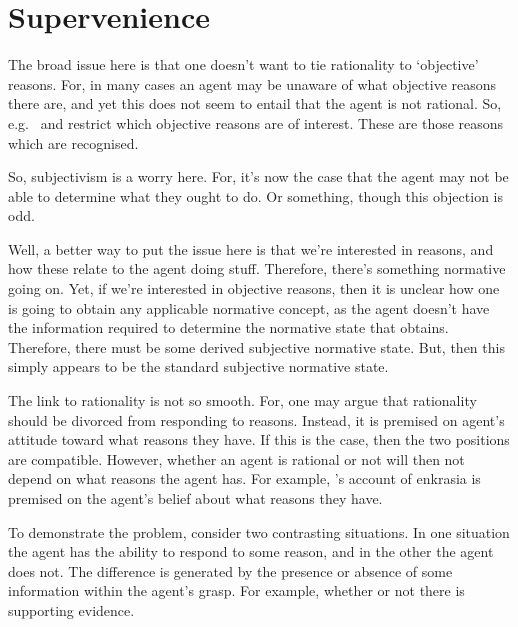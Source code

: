 \documentclass[10pt]{article}
\begin{document}
\section{Supervenience}
\label{sec:supervenience-1}

\begin{note}
  The broad issue here is that one doesn't want to tie rationality to `objective' reasons.
  For, in many cases an agent may be unaware of what objective reasons there are, and yet this does not seem to entail that the agent is not rational.
  So, e.g.\ \citeauthor{Lord:2018aa} and \citeauthor{Kiesewetter:2017aa} restrict which objective reasons are of interest.
  These are those reasons which are recognised.

  So, subjectivism is a worry here.
  For, it's now the case that the agent may not be able to determine what they ought to do.
  Or something, though this objection is odd.

  Well, a better way to put the issue here is that we're interested in reasons, and how these relate to the agent doing stuff.
  Therefore, there's something normative going on.
  Yet, if we're interested in objective reasons, then it is unclear how one is going to obtain any applicable normative concept, as the agent doesn't have the information required to determine the normative state that obtains.
  Therefore, there must be some derived subjective normative state.
  But, then this simply appears to be the standard subjective normative state.
\end{note}


\begin{note}
  The link to rationality is not so smooth.
  For, one may argue that rationality should be divorced from responding to reasons.
  Instead, it is premised on agent's attitude toward what reasons they have.
  If this is the case, then the two positions are compatible.
  However, whether an agent is rational or not will then not depend on what reasons the agent has.
  For example, \citeauthor{Broome:2013aa}'s account of enkrasia is premised on the agent's belief about what reasons they have.
\end{note}

To demonstrate the problem, consider two contrasting situations.
In one situation the agent has the ability to respond to some reason, and in the other the agent does not.
The difference is generated by the presence or absence of some information within the agent's grasp.
For example, whether or not there is supporting evidence.
\end{document}
